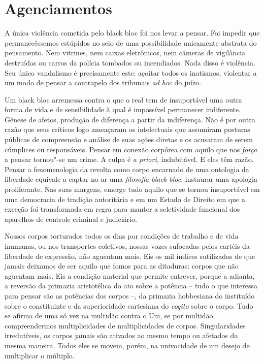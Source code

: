 
\section{Agenciamentos}

A única violência cometida pelo black bloc foi
nos levar a pensar. Foi impedir que permanecêssemos estúpidos no seio de
uma possibilidade unicamente abstrata do pensamento. Nem vitrines, nem
caixas eletrônicos, nem câmeras de vigilância destruídas ou carros da
polícia tombados ou incendiados. Nada disso é violência. Seu único
vandalismo é precisamente este: açoitar todos os inatismos, violentar a
um modo de pensar a contrapelo dos tribunais \emph{ad hoc} do juízo.

Um black bloc arremessa contra o que o real tem de insuportável uma
outra forma de vida e de sensibilidade à qual é impossível permanecer
indiferente. Gênese de afetos, produção de diferença a partir da
indiferença. Não é por outra razão que seus críticos logo ameaçaram os
intelectuais que assumiram posturas públicas de compreensão e análise de
suas ações diretas e os acusaram de serem cúmplices ou responsáveis.
Pensar em conexão corpórea com aquilo que nos \emph{força }a pensar
tornou"-se um crime. A culpa é \emph{a priori, }indubitável. E eles têm
razão. Pensar a fenomenologia da revolta como corpo encarnado de uma
ontologia da liberdade equivale a captar no ar uma \emph{filosofia black
bloc}: instaurar uma apologia proliferante. Nas suas margens, emerge
tudo aquilo que se tornou insuportável em uma democracia de tradição
autoritária e em um Estado de Direito em que a exceção foi transformada
em regra para manter a seletividade funcional dos aparelhos de controle
criminal e judiciário.

Nossos corpos torturados todos os dias por condições de trabalho e de
vida inumanas, ou nos transportes coletivos, nossas vozes sufocadas
pelos cartéis da liberdade de expressão, não aguentam mais. Eis os mil
índices sutilizados de que jamais deixamos de ser aquilo que fomos para
as ditaduras: corpos que não aguentam mais. Eis a condição material que
permite entrever, porque a adianta, a reversão da primazia aristotélica
do ato sobre a potência -- tudo o que interessa para pensar são as
potências dos corpos --, da primazia hobbesiana do instituído sobre o
constituinte e da superioridade cartesiana do \emph{cogito }sobre o
corpo. Tudo se afirma de uma só vez na multidão contra o Um, se por
multidão compreendermos multiplicidades de multiplicidades de corpos.
Singularidades irredutíveis, os corpos jamais são ativados ao mesmo
tempo ou afetados da mesma maneira. Todos eles se movem, porém, na
univocidade de um desejo de multiplicar o múltiplo.

